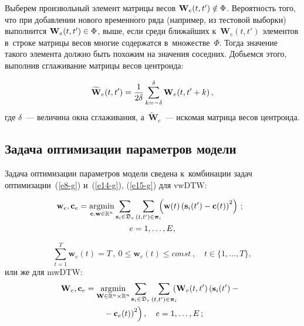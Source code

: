 \begin{multicols}{2}
Выберем произвольный элемент матрицы весов $\mathbf{W}_e(t,t') \hm \notin \Phi$. 
Вероятность того, что при добавлении нового временн$\acute{\mbox{о}}$го ряда (например, из тестовой 
выборки) выполнится $\mathbf{W}_e(t,t')  \hm\in \Phi$, выше, если среди ближайших 
к~$\mathbf{W}_e(t,t')$ элементов в~строке матрицы весов многие содержатся 
в~множестве~$\Phi$. Тогда значение такого элемента должно быть похожим на 
значения соседних. Добьемся этого, выполнив сглаживание матрицы весов центроида:

\noindent
$$
\widetilde{\mathbf{W}}_e(t,t') = \displaystyle\frac{\displaystyle 1\mathstrut}{\displaystyle 2\delta\mathstrut} 
\sum\limits_{k=-\delta}^{\delta}{\mathbf{W}_e(t,t'+k)}\,,
$$
где $\delta$~--- величина окна сглаживания, а~$\widetilde{\mathbf{W}}_e$~--- 
искомая матрица весов центроида.

\pagebreak

\subsection{Задача оптимизации параметров модели}

Задача оптимизации параметров модели сведена к~комбинации задач оптимизации~(\ref{e8-g}) 
и~(\ref{e14-g}), (\ref{e15-g}) для vwDTW:

\noindent
\begin{multline*}
 \!\!\hspace*{-3pt}\mathbf{w}_e, \mathbf{c}_e = \mathop{\mathrm{argmin}}\limits_{{\mathbf{c},\mathbf{w} 
 \in \mathbb{R}^n}}\sum\limits_{\mathbf{s}_i \in \mathfrak{D}_e}
 \sum\limits_{(t,t') \in \boldsymbol{\pi}_i}\hspace*{-1mm}\hspace*{-2pt}\left(
 \mathbf{w}(t)\left(\mathbf{s}_i(t')-\mathbf{c}(t)\right)^2\right)\,; \\ 
 e = 1,\ldots,E,
 \end{multline*}

 \vspace*{-12pt}
 
\noindent
  $$
  \sum\limits_{t=1}^T{\mathbf{w}_e(t)} = T\, , \ 
  0 \leq \mathbf{w}_e(t) \leq const\,, \quad t \in \{1,\ldots,T\},
  $$
или же для mwDTW:
\begin{multline*}
 \hspace*{-2pt}\mathbf{W}_e, \mathbf{c}_e = \mathop{\mathrm{argmin}}\limits_{{\mathbf{W} \in 
 \mathbb{R}^n \times \mathbb{R}^n}}
 \sum\limits_{\mathbf{s}_i \in \mathfrak{D}_e}
 \sum\limits_{\left(t,t'\right) \in \boldsymbol{\pi}_i}\!\!\!\!
 \left(\mathbf{W}_e(t,t')\left(\mathbf{s}_i(t')-{}\right.\right.\\
\left.\left. {}-\mathbf{c}_e(t)\right)^2\right), \quad 
 e = 1,\dots,E\,;
 \end{multline*}
 

\end{multicols}
